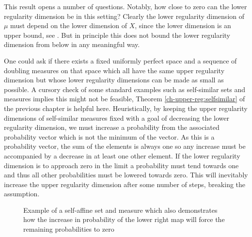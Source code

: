 This result opens a number of questions. Notably, how close to zero can the lower regularity dimension be in this setting? Clearly the lower regularity dimension of $\mu$ must depend on the lower dimension of $X$, since the lower dimension is an upper bound, see \cite{bylund}. But in principle this does not bound the lower regularity dimension from below in any meaningful way. 

One could ask if there exists a fixed uniformly perfect space and a sequence of doubling measures on that space which all have the same upper regularity dimension but whose lower regularity dimensions can be made as small as possible. A cursory check of some standard examples such as self-similar sets and measures implies this might not be feasible, Theorem \ref{ch-upper-reg:selfsimilar} of the previous chapter is helpful here. Heuristically, by keeping the upper regularity dimensions of self-similar measures fixed with a goal of decreasing the lower regularity dimension, we must increase a probability from the associated probability vector which is not the minimum of the vector. As this is a probability vector, the sum of the elements is always one so any increase must be accompanied by a decrease in at least one other element. If the lower regularity dimension is to approach zero in the limit a probability must tend towards one and thus all other probabilities must be lowered towards zero. This will inevitably increase the upper regularity dimension after some number of steps, breaking the assumption.

\begin{figure}[h]
    \centering
    \caption{Example of a self-affine set and measure which also demonstrates how the increase in probability of the lower right map will force the remaining probabilities to zero}
    \label{fig:pathos-ex}
\end{figure}


